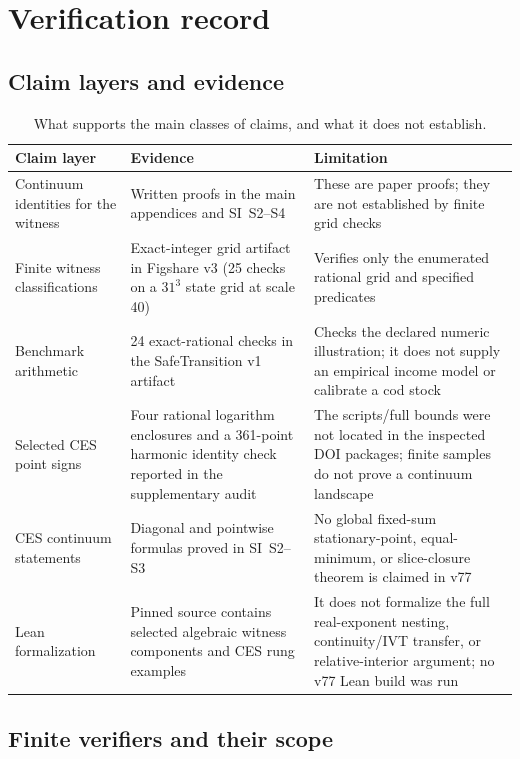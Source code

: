 \section{Verification record}\label{si:verification}

\subsection{Claim layers and evidence}

\begin{table}[!htbp]
\centering\small
\caption{What supports the main classes of claims, and what it does not establish.}
\begin{tabularx}{\textwidth}{@{}>{\raggedright\arraybackslash}p{}XX@{}}
\toprule
Claim layer & Evidence & Limitation \\
\midrule
Continuum identities for the witness & Written proofs in the main appendices and SI~S2--S4 & These are paper proofs; they are not established by finite grid checks \\
Finite witness classifications & Exact-integer grid artifact in Figshare v3 (25 checks on a $31^3$ state grid at scale 40) & Verifies only the enumerated rational grid and specified predicates \\
Benchmark arithmetic & 24 exact-rational checks in the SafeTransition v1 artifact & Checks the declared numeric illustration; it does not supply an empirical income model or calibrate a cod stock \\
Selected CES point signs & Four rational logarithm enclosures and a 361-point harmonic identity check reported in the supplementary audit & The scripts/full bounds were not located in the inspected DOI packages; finite samples do not prove a continuum landscape \\
CES continuum statements & Diagonal and pointwise formulas proved in SI~S2--S3 & No global fixed-sum stationary-point, equal-minimum, or slice-closure theorem is claimed in v77 \\
Lean formalization & Pinned source contains selected algebraic witness components and CES rung examples & It does not formalize the full real-exponent nesting, continuity/IVT transfer, or relative-interior argument; no v77 Lean build was run \\
\bottomrule
\end{tabularx}
\end{table}

\subsection{Finite verifiers and their scope}

